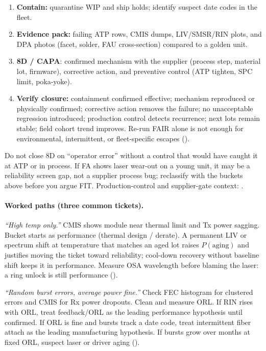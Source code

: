 \begin{enumerate}
\item \textbf{Contain:} quarantine WIP and ship holds; identify suspect date codes
      in the fleet.
\item \textbf{Evidence pack:} failing ATP rows, CMIS dumps, LIV/SMSR/RIN plots, and
      DPA photos (facet, solder, FAU cross-section) compared to a
      golden unit.
\item \textbf{8D / CAPA}: confirmed mechanism with the supplier
      (process step, material lot, firmware), corrective action, and preventive
      control (ATP tighten, SPC limit, poka-yoke).
\item \textbf{Verify closure:} containment confirmed effective; mechanism
      reproduced or physically confirmed; corrective action removes the failure;
      no unacceptable regression introduced; production control detects
      recurrence; next lots remain stable; field cohort trend improves. Re-run
      FAIR alone is not enough for environmental, intermittent, or fleet-specific
      escapes ().
\end{enumerate}

Do not close 8D on ``operator error'' without a control that would have caught
it at ATP or in process. If FA shows laser wear-out on a young unit, it may be a
reliability screen gap, not a supplier process bug; reclassify with the buckets
above before you argue FIT. Production-control and supplier-gate context:
.

\paragraph{Worked paths (three common tickets).}

\emph{``High temp only.''}
CMIS shows module near thermal limit and Tx power sagging. Bucket starts as
performance (thermal design / derate). A permanent LIV or spectrum shift at
temperature that matches an aged lot raises $P(\mathrm{aging})$ and justifies
moving the ticket toward reliability; cool-down recovery without baseline
shift keeps it in performance. Measure OSA wavelength before blaming the
laser: a ring unlock is still performance ().

\emph{``Random burst errors, average power fine.''}
Check FEC histogram for clustered errors and CMIS for Rx power dropouts. Clean
and measure ORL. If RIN rises with ORL, treat feedback/ORL as the leading
performance hypothesis until confirmed. If ORL is fine and bursts track a date
code, treat intermittent fiber attach as the leading manufacturing hypothesis.
If bursts grow over months at fixed ORL, suspect laser or driver aging
().

